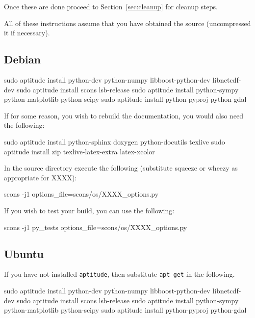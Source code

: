 Once these are done proceed to Section~\ref{sec:cleanup} for cleanup steps.

All of these instructions assume that you have obtained the source (uncompressed it if necessary).
\subsection{Debian}\label{sec:debsrc}

\begin{shellCode}
sudo aptitude install python-dev python-numpy libboost-python-dev libnetcdf-dev
sudo aptitude install scons lsb-release
sudo aptitude install python-sympy python-matplotlib python-scipy
sudo aptitude install python-pyproj python-gdal 
\end{shellCode}


\begin{optionalstep}
If for some reason, you wish to rebuild the documentation, you would also need the following:
\begin{shellCode}
sudo aptitude install python-sphinx doxygen python-docutils texlive 
sudo aptitude install zip texlive-latex-extra latex-xcolor 
\end{shellCode}
\end{optionalstep}

\noindent In the source directory execute the following (substitute squeeze or wheezy as appropriate for XXXX):
\begin{shellCode}
scons -j1 options_file=scons/os/XXXX_options.py
\end{shellCode}

\noindent If you wish to test your build, you can use the following:
\begin{shellCode}
scons -j1 py_tests options_file=scons/os/XXXX_options.py 
\end{shellCode}

\subsection{Ubuntu}\label{sec:ubsrc}

If you have not installed \texttt{aptitude}, then substitute \texttt{apt-get} in the following.
\begin{shellCode}
sudo aptitude install python-dev python-numpy libboost-python-dev libnetcdf-dev
sudo aptitude install scons lsb-release
sudo aptitude install python-sympy python-matplotlib python-scipy
sudo aptitude install python-pyproj python-gdal 
\end{shellCode}


